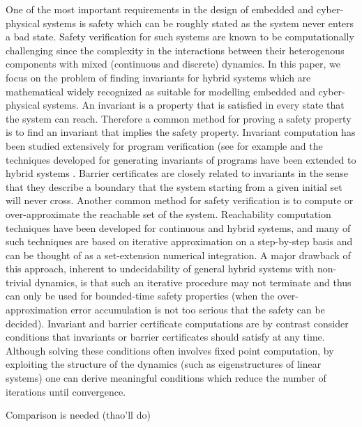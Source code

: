 One of the most important requirements in the design of embedded and cyber-physical systems is safety which can be roughly stated as the system never enters a bad state. Safety verification for such systems are known to be computationally challenging since the complexity in the interactions between their heterogenous components with mixed (continuous and discrete) dynamics. In this paper, we focus on the problem of finding invariants for hybrid systems which are mathematical widely recognized as suitable for modelling embedded and cyber-physical systems. An invariant is a property that is satisfied in every state that the system can reach. 
Therefore a common method for proving a safety property is to find an invariant that implies the safety property. Invariant computation has been studied extensively for program verification (see for example \cite{CousotHalbwachs1978,Bensalem2000,Tiwari2001,SriramSipma2004,colonSriramSipma2003,Fluctuate} and the techniques developed for generating invariants of programs have been extended to hybrid systems \cite{Sriram,Jeannet,tiwariRodriguezCarbonellPolynomialInvariants,Goubault,HybridFluctuate,differentialInvariantPlatzer,Gawlitza}. Barrier certificates \cite{Parillo...} are closely related to invariants in the sense that they describe a boundary that the system starting from a given initial set will never cross. Another common method for safety verification is to compute or over-approximate the reachable set of the system. Reachability computation techniques have been developed for continuous and hybrid systems, and many of such techniques are based on iterative approximation on a step-by-step basis and can be thought of as a set-extension numerical integration. A major drawback of this approach, inherent to undecidability of general hybrid systems with non-trivial dynamics, is that such an iterative procedure may not terminate and thus can only be used for bounded-time safety properties (when the over-approximation error accumulation is not too serious that the safety can be decided). Invariant and barrier certificate computations are by contrast consider conditions that invariants or barrier certificates should satisfy at any time. Although solving these conditions often involves fixed point computation, by exploiting the structure of the dynamics (such as eigenstructures of linear systems) one can derive meaningful conditions which reduce the number of iterations until convergence.

Comparison is needed (thao'll do)


